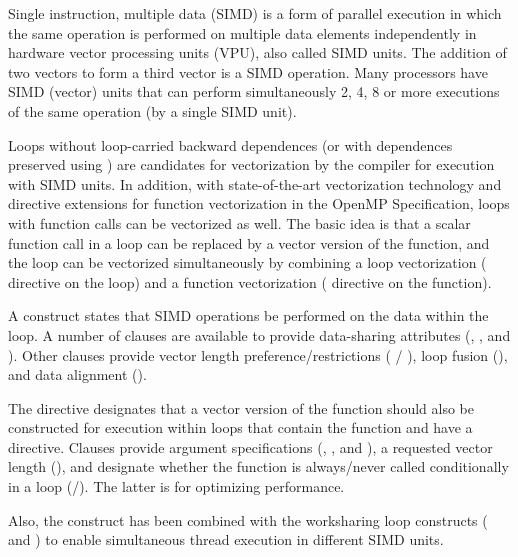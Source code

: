 \label{chap:simd}

Single instruction, multiple data (SIMD) is a form of parallel execution 
in which the same operation is performed on multiple data elements 
independently in hardware vector processing units (VPU), also called SIMD units.
The addition of two vectors to form a third vector is a SIMD operation.
Many processors have SIMD (vector) units that can perform simultaneously 
2, 4, 8 or more executions of the same operation (by a single SIMD unit). 

Loops without loop-carried backward dependences (or with dependences preserved using
) are candidates for vectorization by the compiler for 
execution with SIMD units. In addition, with state-of-the-art vectorization 
technology and  directive extensions for function vectorization
in the OpenMP Specification, loops with function calls can be vectorized as well. 
The basic idea is that a scalar function call in a loop can be replaced by a vector version 
of the function, and the loop can be vectorized simultaneously by combining a loop 
vectorization ( directive on the loop) and a function 
vectorization ( directive on the function).

A  construct states that SIMD operations be performed on the
data within the loop. A number of clauses are available to provide
data-sharing attributes (, ,  and 
).  Other clauses provide vector length preference/restrictions 
( / ), loop fusion (), and data 
alignment ().

The  directive designates
that a vector version of the function should also be constructed for 
execution within loops that contain the function and have a  
directive.  Clauses provide argument specifications (,
, and ), a requested vector length 
(), and designate whether the function is always/never 
called conditionally in a loop (/). 
The latter is for optimizing performance.

Also, the  construct has been combined with the worksharing loop 
constructs ( and ) to enable simultaneous thread 
execution in different SIMD units.  






